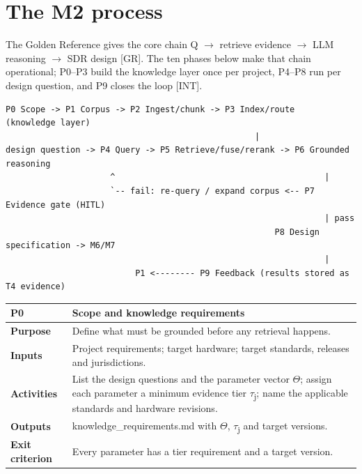 \documentclass[11pt,a4paper]{article}
\newcommand{\prov}[1]{\textsf{\footnotesize[#1]}}
\begin{document}
\section{The M2 process}
The Golden Reference gives the core chain Q \ensuremath{\rightarrow} retrieve evidence \ensuremath{\rightarrow} LLM reasoning \ensuremath{\rightarrow} SDR design \prov{GR}. The ten phases below make that chain operational; P0--P3 build the knowledge layer once per project, P4--P8 run per design question, and P9 closes the loop \prov{INT}.

\begin{lstlisting}
P0 Scope -> P1 Corpus -> P2 Ingest/chunk -> P3 Index/route     (knowledge layer)
                                                  |
design question -> P4 Query -> P5 Retrieve/fuse/rerank -> P6 Grounded reasoning
                     ^                                          |
                     `-- fail: re-query / expand corpus <-- P7 Evidence gate (HITL)
                                                                | pass
                                                      P8 Design specification -> M6/M7
                                                                |
                          P1 <-------- P9 Feedback (results stored as T4 evidence)
\end{lstlisting}
{\small
\begin{longtable}{>{\raggedright\arraybackslash}p{}>{\raggedright\arraybackslash}p{}}
\toprule
\rowcolor{headbg} \textbf{P0} & \textbf{Scope and knowledge requirements} \\
\midrule
\endfirsthead
\bottomrule
\endlastfoot
\textbf{Purpose} & Define what must be grounded before any retrieval happens. \\ \arrayrulecolor{rulec}\hline\arrayrulecolor{black}
\textbf{Inputs} & Project requirements; target hardware; target standards, releases and jurisdictions. \\ \arrayrulecolor{rulec}\hline\arrayrulecolor{black}
\textbf{Activities} & List the design questions and the parameter vector \ensuremath{\Theta}; assign each parameter a minimum evidence tier \ensuremath{\tau}\textsubscript{j}; name the applicable standards and hardware revisions. \\ \arrayrulecolor{rulec}\hline\arrayrulecolor{black}
\textbf{Outputs} & knowledge\_requirements.md with \ensuremath{\Theta}, \ensuremath{\tau}\textsubscript{j} and target versions. \\ \arrayrulecolor{rulec}\hline\arrayrulecolor{black}
\textbf{Exit criterion} & Every parameter has a tier requirement and a target version. \\
\end{longtable}
}
\end{document}
